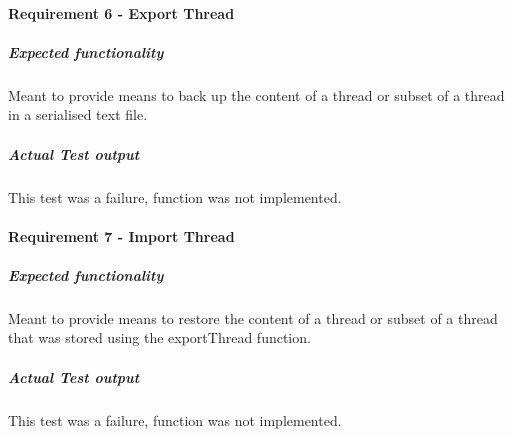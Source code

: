 \paragraph{ Requirement 6 - Export Thread}
\subparagraph{Expected functionality}
	Meant to provide means to back up the content of a thread or subset of a thread in a serialised text file.
	\subparagraph{Actual Test output}
	This test was a failure, function was not implemented.
	
\paragraph{Requirement 7 - Import Thread}
	\subparagraph{Expected functionality}
	Meant to provide means to restore the content of a thread or subset of a thread that was stored using the exportThread function.
	\subparagraph{Actual Test output}
	This test was a failure, function was not implemented.
	


		
	
